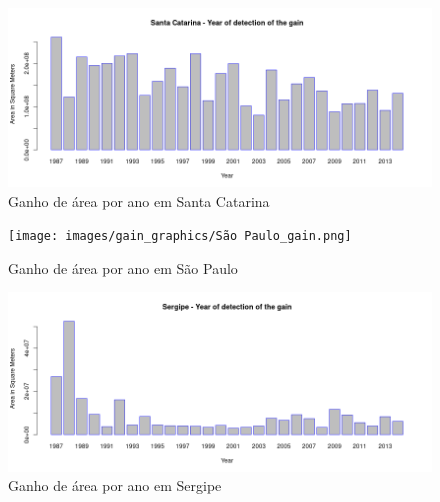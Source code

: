 \begin{figure}[H]
    \centering
    \includegraphics[scale=.5]{images/gain_graphics/Santa Catarina_gain.png}
    \caption{Ganho de área por ano em Santa Catarina}
    \label{fig:gain_santa_catarina}
\end{figure}

\begin{figure}[H]
    \centering
    \texttt{[image: images/gain\_graphics/São Paulo\_gain.png]}
    \caption{Ganho de área por ano em São Paulo}
    \label{fig:gain_sao_paulo}
\end{figure}

\begin{figure}[H]
    \centering
    \includegraphics[scale=.5]{images/gain_graphics/Sergipe_gain.png}
    \caption{Ganho de área por ano em Sergipe}
    \label{fig:gain_sergipe}
\end{figure}